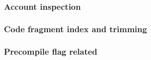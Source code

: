 \subsubsection{Account inspection                  \lispTodo{}}      \label{hub: account: specialized constraints: inspection}                   
\subsubsection{Code fragment index and trimming    \lispDone{}}      \label{hub: account: specialized constraints: CFI and trim}                 
\subsubsection{Precompile flag related             \lispDone{}}      \label{hub: account: specialized constraints: precompile flag related}      
